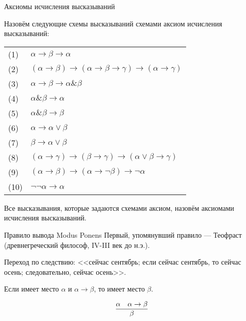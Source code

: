 \documentclass[aspectratio=169]{beamer}
\begin{document}
\begin{frame}{Аксиомы исчисления высказываний}

\begin{defrus}Назовём следующие схемы высказываний схемами аксиом исчисления высказываний:

\begin{tabular}{ll}
(1) & $\alpha \rightarrow \beta \rightarrow \alpha$ \\
(2) & $(\alpha \rightarrow \beta) \rightarrow (\alpha \rightarrow \beta \rightarrow \gamma) \rightarrow (\alpha \rightarrow \gamma)$ \\
(3) & $\alpha \rightarrow \beta \rightarrow \alpha \& \beta$\\
(4) & $\alpha \& \beta \rightarrow \alpha$\\
(5) & $\alpha \& \beta \rightarrow \beta$\\
(6) & $\alpha \rightarrow \alpha \vee \beta$\\
(7) & $\beta \rightarrow \alpha \vee \beta$\\
(8) & $(\alpha \rightarrow \gamma) \rightarrow (\beta \rightarrow \gamma) \rightarrow (\alpha \vee \beta \rightarrow \gamma)$\\
(9) & $(\alpha \rightarrow \beta) \rightarrow (\alpha \rightarrow \neg \beta) \rightarrow \neg \alpha$\\
(10) & $\neg \neg \alpha \rightarrow \alpha$
\end{tabular}

Все высказывания, которые задаются схемами аксиом, назовём аксиомами исчисления высказываний.
\end{defrus}
\end{frame}

\begin{frame}{Правило вывода Modus Ponens}
Первый, упомянувший правило --- Теофраст (древнегреческий философ, IV-III век до н.э.).\pause

\vspace{1cm}

Переход по следствию: <<сейчас сентябрь; если сейчас сентябрь, то сейчас осень; следовательно, сейчас осень>>.\pause

\vspace{1cm}

Если имеет место $\alpha$ и $\alpha\rightarrow\beta$, то имеет место $\beta$.

$$\infer{\beta}{\alpha & \alpha\rightarrow\beta}$$
\end{frame}
\end{document}
